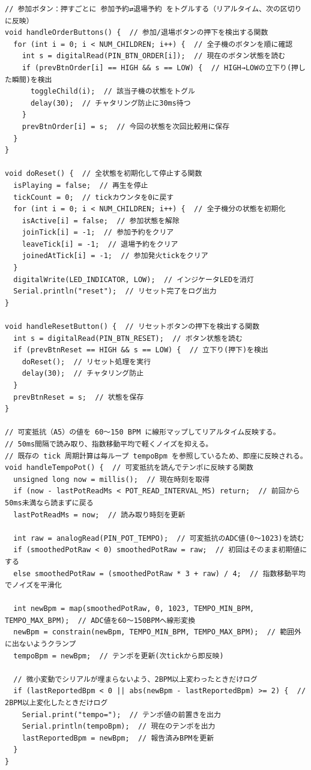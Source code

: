 \documentclass[uplatex,dvipdfmx]{jlreq}
\begin{document}
\begin{lstlisting}
// 参加ボタン：押すごとに 参加予約⇄退場予約 をトグルする（リアルタイム、次の区切りに反映）
void handleOrderButtons() {  // 参加/退場ボタンの押下を検出する関数
  for (int i = 0; i < NUM_CHILDREN; i++) {  // 全子機のボタンを順に確認
    int s = digitalRead(PIN_BTN_ORDER[i]);  // 現在のボタン状態を読む
    if (prevBtnOrder[i] == HIGH && s == LOW) {  // HIGH→LOWの立下り(押した瞬間)を検出
      toggleChild(i);  // 該当子機の状態をトグル
      delay(30);  // チャタリング防止に30ms待つ
    }
    prevBtnOrder[i] = s;  // 今回の状態を次回比較用に保存
  }
}

void doReset() {  // 全状態を初期化して停止する関数
  isPlaying = false;  // 再生を停止
  tickCount = 0;  // tickカウンタを0に戻す
  for (int i = 0; i < NUM_CHILDREN; i++) {  // 全子機分の状態を初期化
    isActive[i] = false;  // 参加状態を解除
    joinTick[i] = -1;  // 参加予約をクリア
    leaveTick[i] = -1;  // 退場予約をクリア
    joinedAtTick[i] = -1;  // 参加発火tickをクリア
  }
  digitalWrite(LED_INDICATOR, LOW);  // インジケータLEDを消灯
  Serial.println("reset");  // リセット完了をログ出力
}

void handleResetButton() {  // リセットボタンの押下を検出する関数
  int s = digitalRead(PIN_BTN_RESET);  // ボタン状態を読む
  if (prevBtnReset == HIGH && s == LOW) {  // 立下り(押下)を検出
    doReset();  // リセット処理を実行
    delay(30);  // チャタリング防止
  }
  prevBtnReset = s;  // 状態を保存
}

// 可変抵抗（A5）の値を 60〜150 BPM に線形マップしてリアルタイム反映する。
// 50ms間隔で読み取り、指数移動平均で軽くノイズを抑える。
// 既存の tick 周期計算は毎ループ tempoBpm を参照しているため、即座に反映される。
void handleTempoPot() {  // 可変抵抗を読んでテンポに反映する関数
  unsigned long now = millis();  // 現在時刻を取得
  if (now - lastPotReadMs < POT_READ_INTERVAL_MS) return;  // 前回から50ms未満なら読まずに戻る
  lastPotReadMs = now;  // 読み取り時刻を更新

  int raw = analogRead(PIN_POT_TEMPO);  // 可変抵抗のADC値(0〜1023)を読む
  if (smoothedPotRaw < 0) smoothedPotRaw = raw;  // 初回はそのまま初期値にする
  else smoothedPotRaw = (smoothedPotRaw * 3 + raw) / 4;  // 指数移動平均でノイズを平滑化

  int newBpm = map(smoothedPotRaw, 0, 1023, TEMPO_MIN_BPM, TEMPO_MAX_BPM);  // ADC値を60〜150BPMへ線形変換
  newBpm = constrain(newBpm, TEMPO_MIN_BPM, TEMPO_MAX_BPM);  // 範囲外に出ないようクランプ
  tempoBpm = newBpm;  // テンポを更新(次tickから即反映)

  // 微小変動でシリアルが埋まらないよう、2BPM以上変わったときだけログ
  if (lastReportedBpm < 0 || abs(newBpm - lastReportedBpm) >= 2) {  // 2BPM以上変化したときだけログ
    Serial.print("tempo=");  // テンポ値の前置きを出力
    Serial.println(tempoBpm);  // 現在のテンポを出力
    lastReportedBpm = newBpm;  // 報告済みBPMを更新
  }
}


\end{lstlisting}
\end{document}
